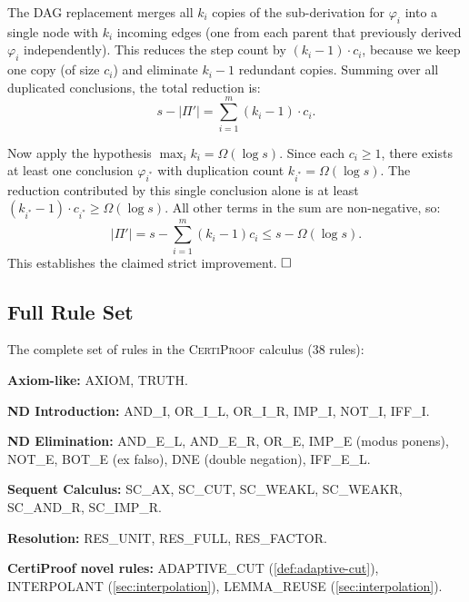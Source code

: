 \documentclass[acmtocl,review,anonymous]{acmart}
\newcommand{\CP}{\textsc{CertiProof}}
\begin{document}
The DAG replacement merges all $k_i$ copies of the sub-derivation for
$\varphi_i$ into a single node with $k_i$ incoming edges (one from each
parent that previously derived $\varphi_i$ independently).  This reduces
the step count by $(k_i - 1) \cdot c_i$, because we keep one copy
(of size $c_i$) and eliminate $k_i - 1$ redundant copies.  Summing over
all duplicated conclusions, the total reduction is:
\[
  s - |\Pi'| = \sum_{i=1}^{m} (k_i - 1) \cdot c_i.
\]

Now apply the hypothesis
$\max_i k_i = \Omega(\log s)$.  Since each $c_i \geq 1$, there exists
at least one conclusion $\varphi_{i^*}$ with duplication count
$k_{i^*} = \Omega(\log s)$.  The reduction contributed by this single
conclusion alone is at least
$(k_{i^*} - 1) \cdot c_{i^*} \geq \Omega(\log s)$.  All other terms in
the sum are non-negative, so:
\[
  |\Pi'| = s - \sum_{i=1}^{m}(k_i - 1) c_i
         \leq s - \Omega(\log s).
\]
This establishes the claimed strict improvement.  $\hfill\square$

\subsection{Full Rule Set}

The complete set of rules in the \CP{} calculus (38 rules):

\medskip
\textbf{Axiom-like:} AXIOM, TRUTH.

\textbf{ND Introduction:} AND\_I, OR\_I\_L, OR\_I\_R, IMP\_I,
NOT\_I, IFF\_I.

\textbf{ND Elimination:} AND\_E\_L, AND\_E\_R, OR\_E, IMP\_E
(modus ponens), NOT\_E, BOT\_E (ex falso), DNE (double negation),
IFF\_E\_L.

\textbf{Sequent Calculus:} SC\_AX, SC\_CUT, SC\_WEAKL, SC\_WEAKR,
SC\_AND\_R, SC\_IMP\_R.

\textbf{Resolution:} RES\_UNIT, RES\_FULL, RES\_FACTOR.

\textbf{CertiProof novel rules:} ADAPTIVE\_CUT
(\cref{def:adaptive-cut}), INTERPOLANT (\cref{sec:interpolation}),
LEMMA\_REUSE (\cref{sec:interpolation}).
\end{document}

